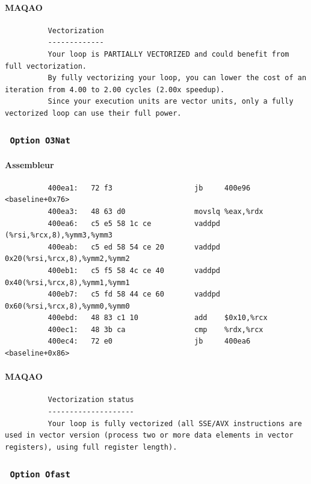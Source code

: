 \documentclass{report}
\begin{document}
      \paragraph{MAQAO}
        \begin{verbatim}
          Vectorization
          -------------
          Your loop is PARTIALLY VECTORIZED and could benefit from full vectorization.
          By fully vectorizing your loop, you can lower the cost of an iteration from 4.00 to 2.00 cycles (2.00x speedup).
          Since your execution units are vector units, only a fully vectorized loop can use their full power.
        \end{verbatim}
      \subsubsection{ \texttt{ Option O3Nat} }
      \paragraph{Assembleur}
        \begin{verbatim}
          400ea1:	72 f3                	jb     400e96 <baseline+0x76>
          400ea3:	48 63 d0             	movslq %eax,%rdx
          400ea6:	c5 e5 58 1c ce       	vaddpd (%rsi,%rcx,8),%ymm3,%ymm3
          400eab:	c5 ed 58 54 ce 20    	vaddpd 0x20(%rsi,%rcx,8),%ymm2,%ymm2
          400eb1:	c5 f5 58 4c ce 40    	vaddpd 0x40(%rsi,%rcx,8),%ymm1,%ymm1
          400eb7:	c5 fd 58 44 ce 60    	vaddpd 0x60(%rsi,%rcx,8),%ymm0,%ymm0
          400ebd:	48 83 c1 10          	add    $0x10,%rcx
          400ec1:	48 3b ca             	cmp    %rdx,%rcx
          400ec4:	72 e0                	jb     400ea6 <baseline+0x86>
        \end{verbatim}
      \paragraph{MAQAO}
        \begin{verbatim}
          Vectorization status
          --------------------
          Your loop is fully vectorized (all SSE/AVX instructions are used in vector version (process two or more data elements in vector registers), using full register length).
        \end{verbatim}
      \subsubsection{ \texttt{ Option Ofast } }
\end{document}
